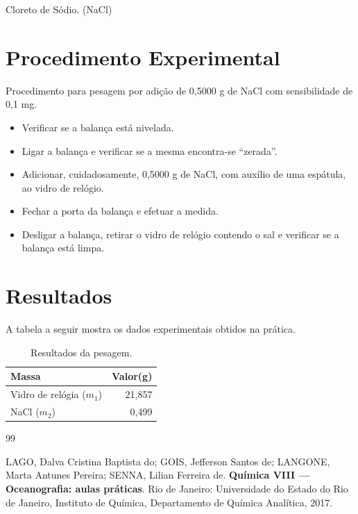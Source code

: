 \documentclass[a4paper,12pt]{article}
\begin{document}
Cloreto de Sódio. (NaCl)

\section{Procedimento Experimental}
Procedimento para pesagem por adição de 0,5000 g de NaCl com sensibilidade de 0,1 mg.

\begin{itemize}
    \item Verificar se a balança está nivelada.
    \item Ligar a balança e verificar se a mesma encontra-se “zerada”.
    \item Adicionar, cuidadosamente, 0,5000 g de NaCl, com auxílio de uma espátula, ao vidro de relógio.
    \item Fechar a porta da balança e efetuar a medida.
    \item Desligar a balança, retirar o vidro de relógio contendo o sal e verificar se a balança está limpa.
\end{itemize}

\section{Resultados}

A tabela a seguir  mostra os dados experimentais obtidos na prática.
\begin{table}[H]
\centering
\caption{Resultados da pesagem.}
\label{tab:exemplo}
\begin{tabular}{lr}
\toprule
\textbf{Massa} & \textbf{Valor(g)} \\
\midrule
Vidro de relógia ($m_1$) & 21,857 \\
NaCl ($m_2$)& 0,499 \\
\bottomrule
\end{tabular}
\end{table}

\newpage
{}
{}
\begin{thebibliography}{99}

LAGO, Dalva Cristina Baptista do;
GOIS, Jefferson Santos de;
LANGONE, Marta Antunes Pereira;
SENNA, Lilian Ferreira de.
\textbf{Química VIII — Oceanografia: aulas práticas}.
Rio de Janeiro: Universidade do Estado do Rio de Janeiro, Instituto de Química, Departamento de Química Analítica, 2017.

\end{thebibliography}
\end{document}
